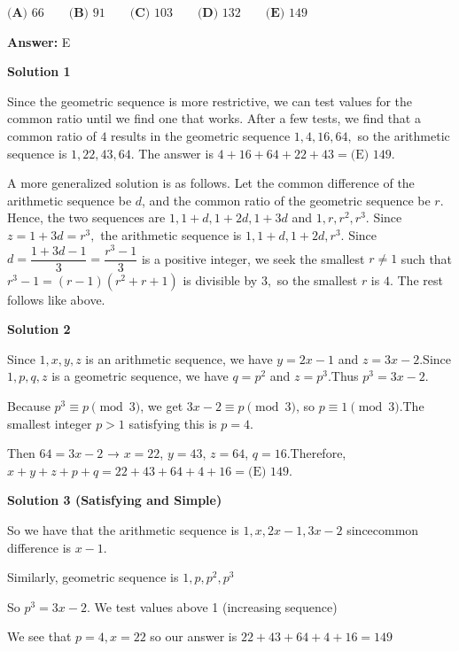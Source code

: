 \begin{enumerate}
 $\textbf{(A) } 66 \qquad\textbf{(B) } 91 \qquad\textbf{(C) } 103 \qquad\textbf{(D) } 132 \qquad\textbf{(E) } 149$

 \textbf{Answer: }E



\textbf{Solution 1}

Since the geometric sequence is more restrictive, we can test values for the common ratio until we find one that works. After a few tests, we find that a common ratio of $4$ results in the geometric sequence $1,4,16,64,$ so the arithmetic sequence is $1,22,43,64.$ The answer is $4+16+64+22+43=\boxed{\text{(E) }149}.$

 A more generalized solution is as follows. Let the common difference of the arithmetic sequence be $d$, and the common ratio of the geometric sequence be $r.$ Hence, the two sequences are $1,1+d,1+2d,1+3d$ and $1,r,r^2,r^3.$ Since $z=1+3d=r^3,$ the arithmetic sequence is $1,1+d,1+2d,r^3.$ Since $d=\dfrac{1+3d-1}{3}=\dfrac{r^3-1}{3}$ is a positive integer, we seek the smallest $r\neq1$ such that $r^3-1=(r-1)(r^2+r+1)$ is divisible by $3,$ so the smallest $r$ is $4$. The rest follows like above.

 



\textbf{Solution 2}

Since $1, x, y, z$ is an arithmetic sequence, we have $y = 2x - 1$ and $z = 3x - 2$.Since $1, p, q, z$ is a geometric sequence, we have $q = p^2$ and $z = p^3$.Thus $p^3 = 3x - 2.$

 Because $p^3 \equiv p \pmod{3}$, we get $3x - 2 \equiv p \pmod{3}$, so $p \equiv 1 \pmod{3}$.The smallest integer $p > 1$ satisfying this is $p = 4$.

 Then $64 = 3x - 2$ → $x = 22$, $y = 43$, $z = 64$, $q = 16$.Therefore, $x + y + z + p + q = 22 + 43 + 64 + 4 + 16 = \boxed{\text{(E) }149}$.

 



\textbf{Solution 3 (Satisfying and Simple)}

So we have that the arithmetic sequence is $1, x, 2x-1, 3x-2$ sincecommon difference is $x - 1$.

 Similarly, geometric sequence is $1, p, p^2, p^3$

 So $p^3 = 3x-2$. We test values above 1 (increasing sequence)

 We see that $p = 4, x = 22$ so our answer is $22 + 43 + 64 + 4 + 16 = \boxed{149}$





\end{enumerate}
